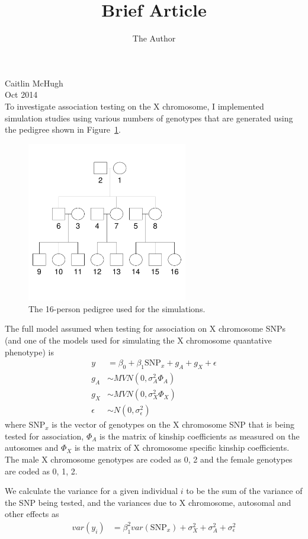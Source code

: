 \documentclass[11pt]{article} %
\title{Brief Article}
\author{The Author}
\newcommand{\snpX}{\mbox{SNP}_x}
\begin{document}
\noindent Caitlin McHugh\\
Oct 2014 \\ 

\noindent To investigate association testing on the X chromosome, I implemented simulation studies using various numbers of genotypes that are generated using the pedigree shown in Figure~\ref{ped}. 

\begin{figure}[hb]
\centering
\includegraphics[height=7cm]{pedigree_16individs.pdf}
\caption{The 16-person pedigree used for the simulations.}
\label{ped}
\end{figure}

The full model assumed when testing for association on X chromosome SNPs (and one of the models used for simulating the X chromosome quantative phenotype) is 
\begin{align}
y &= \beta_0 + \beta_1 \snpX + g_A + g_X +\epsilon \\
g_A &\sim MVN(0,\sigma^2_A \Phi_A) \\
g_X &\sim MVN(0,\sigma^2_X \Phi_X) \\
\epsilon &\sim N(0,\sigma^2_\epsilon)
\end{align}
where SNP$_x$ is the vector of genotypes on the X chromosome SNP that is being tested for association, $\Phi_A$ is the matrix of kinship coefficients as measured on the autosomes and $\Phi_X$ is the matrix of X chromosome specific kinship coefficients. The male X chromosome genotypes are coded as 0, 2 and the female genotypes are coded as 0, 1, 2.

We calculate the variance for a given individual $i$ to be the sum of the variance of the SNP being tested, and the variances due to X chromosome, autosomal and other effects as
\begin{align}
var(y_i)&=\beta_1^2 var(\snpX)+\sigma^2_X +\sigma^2_A + \sigma^2_\epsilon
\end{align}
\end{document}
